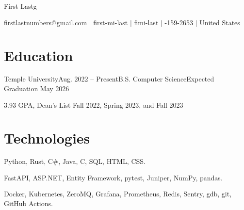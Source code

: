 \documentclass[letterpaper,11pt]{article}
\makeatletter
\newcommand{\myemail}{firstlastnumbers@gmail.com}
\newcommand{\myname}{First Lastg}
\newcommand{\mygh}{first-mi-last}
\newcommand{\mylinkedin}{fimi-last}
\newcommand{\myphone}{314-159-2653}
\newcommand{\mylocation}{United States}
\newcommand{\myemail}{jonathanzhang929@gmail.com}
\newcommand{\myname}{Jonathan Zhang}
\newcommand{\mygh}{jonathan-d-zhang}
\newcommand{\mylinkedin}{jd-zhang}
\newcommand{\myphone}{484-986-8012}
\newcommand{\mylocation}{Philadelphia, PA}
\makeatother
\begin{document}
{\Huge \myname}
\\
\vspace{2pt}

\small{
    \faEnvelope
    \thinspace \thinspace
    \myemail
    \thinspace \thinspace $|$
    \faGithub
    \thinspace \thinspace
    \mygh
    \thinspace \thinspace $|$
    \faLinkedin
    \thinspace \thinspace
    \mylinkedin
    \thinspace \thinspace $|$
    \faPhone
    \thinspace \thinspace
    \myphone
    \thinspace \thinspace $|$
    \thinspace \thinspace
    \mylocation
}

\vspace{-8pt}

\section{Education}
\begin{entries}
    \item\begin{experience}{Temple University}{Aug. 2022 -- Present}{B.S. Computer Science}{Expected Graduation May 2026}
        \item 3.93 GPA, Dean's List Fall 2022, Spring 2023, and Fall 2023
    \end{experience}
\end{entries}

\section{Technologies}
\begin{description}[nosep, labelindent=0.15in]
    \item[Programming Languages:]
        Python,
        Rust,
        C\#,
        Java,
        C,
        SQL,
        HTML,
        CSS.
    \item[Libraries:]
        FastAPI,
        ASP.NET,
        Entity Framework,
        pytest,
        Juniper,
        NumPy,
        pandas.
    \item[Tools:]
        Docker,
        Kubernetes,
        ZeroMQ,
        Grafana,
        Prometheus,
        Redis,
        Sentry,
        gdb,
        git,
        GitHub Actions.
\end{description}
\end{document}

